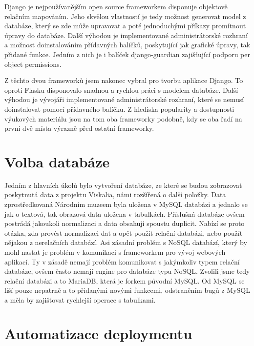Django je nejpoužívanějším open source frameworkem disponuje objektově
relačním mapováním. Jeho skvělou vlastností je tedy možnost generovat
model z databáze, který se zde může upravovat a poté jednoduchými
příkazy promítnout úpravy do databáze. Další výhodou je implementované
administrátorské rozhraní a možnost doinstalováním přídavných balíčků,
poskytující jak grafické úpravy, tak přidané funkce. Jedním z nich je
i balíček django-guardian zajišťující podporu per object permissions.

Z těchto dvou frameworků jsem nakonec vybral pro tvorbu aplikace
Django. To oproti Flasku disponovalo snadnou a rychlou práci s modelem
databáze. Další výhodou je vývojáři implementované administrátorské
rozhraní, které se nemusí doinstalovat pomocí přídavného balíčku. Z
hlediska popularity a dostupnosti výukových materiálu jsou na tom oba
frameworky podobně, kdy se oba řadí na první dvě místa výrazně před
ostatní frameworky.

\vspace{10px}

\section{Volba databáze}

Jedním z hlavních úkolů bylo vytvoření databáze, ze které se budou
zobrazovat poskytnutá data z projektu Viskalia, námi rozšířená o další
položky. Data zprostředkovaná Národním muzeem byla uložena v MySQL
databázi a jednalo se jak o textová, tak obrazová data uložena v
tabulkách. Příslušná databáze ovšem postrádá jakoukoli normalizaci a
data obsahují spoustu duplicit. Nabízí se proto otázka, zda provést
normalizaci dat a opět použít relační databázi, nebo použít nějakou z
nerelačních databází. Asi zásadní problém s NoSQL databází, který by
mohl nastat je problém v komunikaci s frameworkem pro vývoj webových
aplikací. Ty v zásadě nemají problém komunikovat s jakýmkoliv typem
relační databáze, ovšem často nemají engine pro databáze typu
NoSQL. Zvolili jsme tedy relační databázi a to MariaDB, která je
forkem původní MySQL. Od MySQL se liší pouze nepatrně a to přidanými
novými funkcemi, odstraněním bugů z MySQL a měla by zajišťovat
rychlejší operace s tabulkami.

\section{Automatizace deploymentu}

